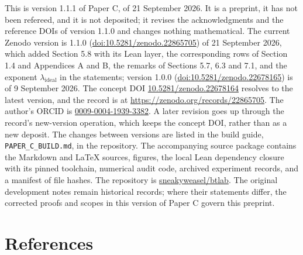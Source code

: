 \documentclass[11pt,a4paper]{article}
\begin{document}
This is version 1.1.1 of Paper C, of 21 September 2026. It is a
preprint, it has not been refereed, and it is not deposited; it revises
the acknowledgments and the reference DOIs of version 1.1.0 and changes
nothing mathematical. The current Zenodo version is 1.1.0
(\href{https://doi.org/10.5281/zenodo.22865705}{doi:10.5281/zenodo.22865705})
of 21 September 2026, which added Section 5.8 with its Lean layer, the
corresponding rows of Section 1.4 and Appendices A and B, the remarks of
Sections 5.7, 6.3 and 7.1, and the exponent \(\lambda_{\mathrm{ideal}}\)
in the statements; version 1.0.0
(\href{https://doi.org/10.5281/zenodo.22678165}{doi:10.5281/zenodo.22678165})
is of 9 September 2026. The concept DOI
\href{https://doi.org/10.5281/zenodo.22678164}{10.5281/zenodo.22678164}
resolves to the latest version, and the record is at
\url{https://zenodo.org/records/22865705}. The author's ORCID is
\href{https://orcid.org/0009-0004-1939-3382}{0009-0004-1939-3382}. A
later revision goes up through the record's new-version operation, which
keeps the concept DOI, rather than as a new deposit. The changes between
versions are listed in the build guide,
\texttt{\nolinkurl{PAPER_C_BUILD.md}}, in the repository. The
accompanying source package contains the Markdown and LaTeX sources,
figures, the local Lean dependency closure with its pinned toolchain,
numerical audit code, archived experiment records, and a manifest of
file hashes. The repository is
\href{https://github.com/sneakyweasel/btlab}{sneakyweasel/btlab}. The
original development notes remain historical records; where their
statements differ, the corrected proofs and scopes in this version of
Paper C govern this preprint.

\section{References}\label{references}

\begingroup\small
\end{document}
